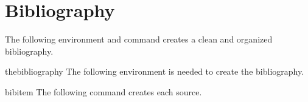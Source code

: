 \documentclass[12pt,hidelinks]{article}
\begin{document}



























































\section{Bibliography}
\vspace{10.5cm}
The following environment and command creates a clean and organized bibliography.
	\begin{docEnvironment}{thebibliography}{}
			The following environment is needed to create the bibliography.
	\end{docEnvironment}
	\begin{docCommand}{bibitem}{}
			The following command creates each source.
	\end{docCommand}
\end{document}
